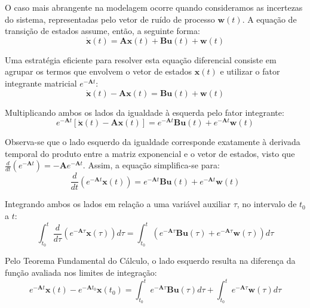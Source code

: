 \documentclass[a4paper,12pt]{article}
\begin{document}
O caso mais abrangente na modelagem ocorre quando consideramos as incertezas do sistema, representadas pelo vetor de ruído de processo $\mathbf{w}(t)$. A equação de transição de estados assume, então, a seguinte forma:
\begin{equation}
    \dot{\mathbf{x}}(t) = \mathbf{A}\mathbf{x}(t) + \mathbf{B}\mathbf{u}(t) + \mathbf{w}(t)
    \label{eq:eqComRuido}
\end{equation}

Uma estratégia eficiente para resolver esta equação diferencial consiste em agrupar os termos que envolvem o vetor de estados $\mathbf{x}(t)$ e utilizar o fator integrante matricial $e^{-\mathbf{A}t}$:
\begin{equation}
    \dot{\mathbf{x}}(t) - \mathbf{A}\mathbf{x}(t) = \mathbf{B}\mathbf{u}(t) + \mathbf{w}(t)
\end{equation}

Multiplicando ambos os lados da igualdade à esquerda pelo fator integrante:
\begin{equation}
    e^{-\mathbf{A}t} \left[ \dot{\mathbf{x}}(t) - \mathbf{A}\mathbf{x}(t) \right] = e^{-\mathbf{A}t} \mathbf{B}\mathbf{u}(t) + e^{-\mathbf{A}t} \mathbf{w}(t)
\end{equation}

Observa-se que o lado esquerdo da igualdade corresponde exatamente à derivada temporal do produto entre a matriz exponencial e o vetor de estados, visto que $\frac{d}{dt}\left(e^{-\mathbf{A}t}\right) = -\mathbf{A}e^{-\mathbf{A}t}$. Assim, a equação simplifica-se para:
\begin{equation}
    \frac{d}{dt} \left( e^{-\mathbf{A}t} \mathbf{x}(t) \right) = e^{-\mathbf{A}t} \mathbf{B}\mathbf{u}(t) + e^{-\mathbf{A}t} \mathbf{w}(t)
\end{equation}

Integrando ambos os lados em relação a uma variável auxiliar $\tau$, no intervalo de $t_0$ a $t$:
\begin{equation}
    \int_{t_0}^t \frac{d}{d\tau} \left( e^{-\mathbf{A}\tau} \mathbf{x}(\tau) \right) d\tau = \int_{t_0}^t \left( e^{-\mathbf{A}\tau} \mathbf{B}\mathbf{u}(\tau) + e^{-\mathbf{A}\tau} \mathbf{w}(\tau) \right) d\tau
\end{equation}

Pelo Teorema Fundamental do Cálculo, o lado esquerdo resulta na diferença da função avaliada nos limites de integração:
\begin{equation}
    e^{-\mathbf{A}t}\mathbf{x}(t) - e^{-\mathbf{A}t_0}\mathbf{x}(t_0) = \int_{t_0}^t e^{-\mathbf{A}\tau} \mathbf{B}\mathbf{u}(\tau) d\tau + \int_{t_0}^t e^{-\mathbf{A}\tau} \mathbf{w}(\tau) d\tau
\end{equation}
\end{document}
